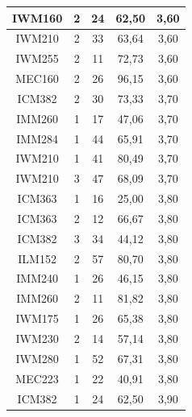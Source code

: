 \documentclass[12pt]{article}
\begin{document}
\begin{table}[H]
{{\begin{minipage}[b]{.5\hsize}
{\begin{tabular}{|c|c|c|c|c|}
            \rowcolor[HTML]{DAEBFB} 
            IWM160 & 2 & 24 & 62,50 & 3,60 \\ \hline
            \rowcolor[HTML]{DAEBFB} 
            IWM210 & 2 & 33 & 63,64 & 3,60 \\ \hline
            \rowcolor[HTML]{DAEBFB} 
            IWM255 & 2 & 11 & 72,73 & 3,60 \\ \hline
            \rowcolor[HTML]{DAEBFB} 
            MEC160 & 2 & 26 & 96,15 & 3,60 \\ \hline
            \rowcolor[HTML]{DAEBFB} 
            ICM382 & 2 & 30 & 73,33 & 3,70 \\ \hline
            \rowcolor[HTML]{DAEBFB} 
            IMM260 & 1 & 17 & 47,06 & 3,70 \\ \hline
            \rowcolor[HTML]{DAEBFB} 
            IMM284 & 1 & 44 & 65,91 & 3,70 \\ \hline
            \rowcolor[HTML]{DAEBFB} 
            IWM210 & 1 & 41 & 80,49 & 3,70 \\ \hline
            \rowcolor[HTML]{DAEBFB} 
            IWM210 & 3 & 47 & 68,09 & 3,70 \\ \hline
            \rowcolor[HTML]{DAEBFB} 
            ICM363 & 1 & 16 & 25,00 & 3,80 \\ \hline
            \rowcolor[HTML]{DAEBFB} 
            ICM363 & 2 & 12 & 66,67 & 3,80 \\ \hline
            \rowcolor[HTML]{DAEBFB} 
            ICM382 & 3 & 34 & 44,12 & 3,80 \\ \hline
            \rowcolor[HTML]{DAEBFB} 
            ILM152 & 2 & 57 & 80,70 & 3,80 \\ \hline
            \rowcolor[HTML]{DAEBFB} 
            IMM240 & 1 & 26 & 46,15 & 3,80 \\ \hline
            \rowcolor[HTML]{DAEBFB} 
            IMM260 & 2 & 11 & 81,82 & 3,80 \\ \hline
            \rowcolor[HTML]{DAEBFB} 
            IWM175 & 1 & 26 & 65,38 & 3,80 \\ \hline
            \rowcolor[HTML]{DAEBFB} 
            IWM230 & 2 & 14 & 57,14 & 3,80 \\ \hline
            \rowcolor[HTML]{DAEBFB} 
            IWM280 & 1 & 52 & 67,31 & 3,80 \\ \hline
            \rowcolor[HTML]{DAEBFB} 
            MEC223 & 1 & 22 & 40,91 & 3,80 \\ \hline
            \rowcolor[HTML]{DAEBFB} 
            ICM382 & 1 & 24 & 62,50 & 3,90 \\ \hline

\end{tabular}}
\end{minipage}}}
\end{table}
\end{document}
